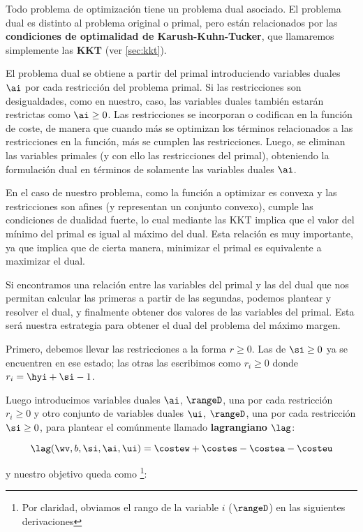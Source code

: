 Todo problema de optimización tiene un problema dual asociado. El problema dual es distinto al problema original o primal, pero están relacionados por las \textbf{condiciones de optimalidad de Karush-Kuhn-Tucker}, que llamaremos simplemente las \textbf{KKT} (ver \ref{sec:kkt}). 

El problema dual se obtiene a partir del primal introduciendo variables duales $\ai$ por cada restricción del problema primal. Si las restricciones son desigualdades, como en nuestro, caso, las variables duales también estarán restrictas como $\ai \geq 0$. Las restricciones se incorporan o codifican en la función de coste, de manera que cuando más se optimizan los términos relacionados a las restricciones en la función, más se cumplen las restricciones. Luego, se eliminan las variables primales (y con ello las restricciones del primal), obteniendo la formulación dual en términos de solamente las variables duales $\ai$. 

En el caso de nuestro problema, como la función a optimizar es convexa y las restricciones son afines (y representan un conjunto convexo), cumple las condiciones de dualidad fuerte, lo cual mediante las KKT implica que el valor del mínimo del primal es igual al máximo del dual. Esta relación es muy importante, ya que implica que de cierta manera, minimizar el primal es equivalente a maximizar el dual. 

Si encontramos una relación entre las variables del primal y las del dual que nos permitan calcular las primeras a partir de las segundas, podemos plantear y resolver el dual, y finalmente obtener dos valores de las variables del primal. Esta será nuestra estrategia para obtener el dual del problema del máximo margen. 

Primero, debemos llevar las restricciones a la forma $ r \geq 0$. Las de $\si \geq 0 $ ya se encuentren en ese estado; las otras las escribimos como $r_i \geq 0$ donde $r_i = \hyi +\si - 1$. 

Luego introducimos variables duales $\ai$, $\rangeD$, una por cada restricción $r_i \geq 0$ y otro conjunto de variables duales $\ui$, $\rangeD$, una por cada restricción $\si \geq 0$, para plantear el comúnmente llamado \textbf{lagrangiano} $\lag$:


\begin{equation*}
\lag(\wv,b,\si,\ai,\ui) = \costew + \costes - \costea - \costeu 
\end{equation*}

y nuestro objetivo queda como \footnote{Por claridad, obviamos el rango de la variable $i$ ($\rangeD$) en las siguientes derivaciones}:

